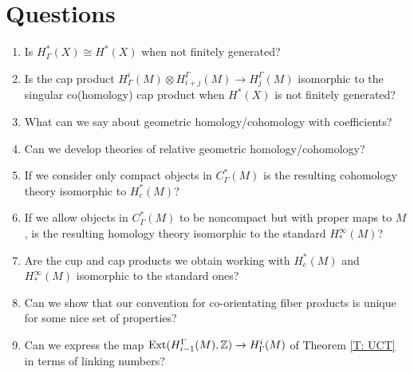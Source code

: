 




\section{Questions}


\begin{enumerate}

\item Is $H^*_\Gamma(X)\cong H^*(X)$ when not finitely generated?


\item Is the cap product $H^i_\Gamma(M)\otimes H_{i+j}^\Gamma(M)\to H^\Gamma_j(M)$ isomorphic to the singular co(homology) cap product when $H^*(X)$ is not finitely generated?

\begin{comment}
\item For a closed oriented $M^m$, is the Poincar\'e duality map $H^i_\Gamma(M)\to H_{m-i}^\Gamma(M)$ that takes a cochain to a chain simply by converting the co-orientation to an orientation (via our standard construction over oriented manifolds) isomorphic to the singular co(homology) cap product with the fundamental class via the isomorphisms of homology and cohomology groups we have developed.
\end{comment}

\item What can we say about geometric homology/cohomology with coefficients?

\item Can we develop theories of relative geometric homology/cohomology?

\item If we consider only compact objects in $C_\Gamma^*(M)$ is the resulting cohomology theory isomorphic to $H^*_c(M)$?

\item If we allow objects in $C^*_\Gamma(M)$ to be noncompact but with proper maps to $M$, is the resulting homology theory isomorphic to the standard $H^\infty_*(M)$?

\item Are the cup and cap products we obtain working with $H^*_c(M)$ and $H^\infty_*(M)$ isomorphic to the standard ones?

\item Can we show that our convention for co-orientating fiber products is unique for some nice set of properties?

 \item Can we express the map $\text{Ext}(H_{i-1}^\Gamma(M),\mathbb{Z})\to H^i_\Gamma(M)$ of Theorem \ref{T: UCT} in terms of linking numbers?


\end{enumerate}
